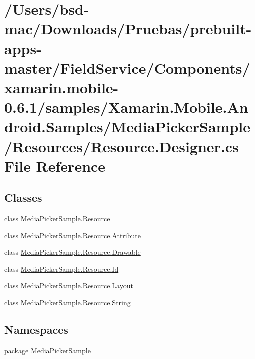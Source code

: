 \hypertarget{_components_2xamarin_8mobile-0_86_81_2samples_2_xamarin_8_mobile_8_android_8_samples_2_media_picb4289798373573612b81d1923e7d12fa}{\section{/\+Users/bsd-\/mac/\+Downloads/\+Pruebas/prebuilt-\/apps-\/master/\+Field\+Service/\+Components/xamarin.mobile-\/0.6.1/samples/\+Xamarin.Mobile.\+Android.\+Samples/\+Media\+Picker\+Sample/\+Resources/\+Resource.Designer.\+cs File Reference}
\label{_components_2xamarin_8mobile-0_86_81_2samples_2_xamarin_8_mobile_8_android_8_samples_2_media_picb4289798373573612b81d1923e7d12fa}
}
\subsection*{Classes}
\begin{DoxyCompactItemize}
\item 
class \hyperlink{class_media_picker_sample_1_1_resource}{Media\+Picker\+Sample.\+Resource}
\item 
class \hyperlink{class_media_picker_sample_1_1_resource_1_1_attribute}{Media\+Picker\+Sample.\+Resource.\+Attribute}
\item 
class \hyperlink{class_media_picker_sample_1_1_resource_1_1_drawable}{Media\+Picker\+Sample.\+Resource.\+Drawable}
\item 
class \hyperlink{class_media_picker_sample_1_1_resource_1_1_id}{Media\+Picker\+Sample.\+Resource.\+Id}
\item 
class \hyperlink{class_media_picker_sample_1_1_resource_1_1_layout}{Media\+Picker\+Sample.\+Resource.\+Layout}
\item 
class \hyperlink{class_media_picker_sample_1_1_resource_1_1_string}{Media\+Picker\+Sample.\+Resource.\+String}
\end{DoxyCompactItemize}
\subsection*{Namespaces}
\begin{DoxyCompactItemize}
\item 
package \hyperlink{namespace_media_picker_sample}{Media\+Picker\+Sample}
\end{DoxyCompactItemize}
